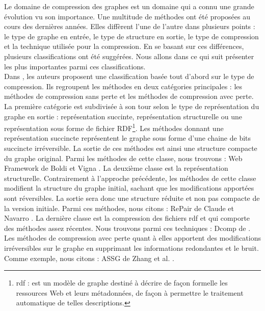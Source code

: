 Le domaine de compression des graphes est un domaine qui a connu une grande évolution vu son importance. Une multitude de méthodes ont été proposées au cours des dernières années. Elles diffèrent l'une de l'autre dans plusieurs points : le type de graphe en entrée, le type de structure en sortie, le type de compression et la technique utilisée pour la compression. En se basant sur ces différences, plusieurs classifications ont été suggérées. Nous allons dans ce qui suit présenter les plus importantes parmi ces classifications.\\

Dans \citep{maneth2015survey}, les auteurs proposent une classification basée tout d'abord sur le type de compression. Ils regroupent les méthodes en deux catégories principales : les méthodes de compression sans perte et les méthodes de compression avec perte. La première catégorie est subdivisée à son tour selon le type de représentation du graphe en sortie : représentation succinte, représentation structurelle ou une représentation sous forme de fichier RDF\footnote{\gls{rdf} : est un modèle de graphe destiné à décrire de façon formelle les ressources Web et leurs métadonnées, de façon à permettre le traitement automatique de telles descriptions.}. 
Les méthodes donnant une représentation succincte représentent le graphe sous forme d'une chaine de bits succincte irréversible. La sortie de ces méthodes est ainsi une structure compacte du graphe original. Parmi les méthodes de cette classe, nous trouvons : Web Framework de Boldi et Vigna \citep{boldi2004webgraph}. La deuxième classe est la représentation structurelle. Contrairement à l'approche précédente, les méthodes de cette classe modifient la structure du graphe initial, sachant que les modifications apportées sont réversibles. La sortie sera donc une structure réduite et non pas compacte de la version initiale. Parmi ces méthodes, nous citons : RePair de Claude et Navarro \citep{claude2010fast}. La dernière classe est la compression  des fichiers \gls{rdf} et qui comporte des méthodes assez récentes. Nous trouvons parmi ces techniques : Dcomp de \citep{martinez2012compression} . Les méthodes de compression avec perte quant à elles apportent des modifications irréversibles sur le graphe en supprimant les informations redondantes et le bruit. Comme exemple, nous citons : ASSG de Zhang et al. \citep{zhang2014assg}.\\

